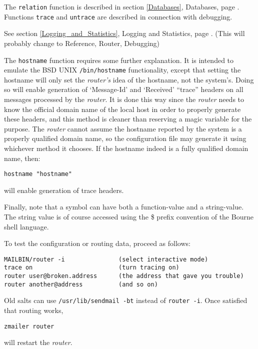 The {\tt relation} function is described in section
\ref{Databases},  Databases,
page \pageref{Databases}.
Functions {\tt trace} and {\tt untrace} are described
in connection with debugging. 

See section \ref{Logging_and_Statistics}, Logging and Statistics,
page \pageref{Logging_and_Statistics}.
(This will probably change to Reference, Router, Debugging)

The {\tt hostname} function requires some further explanation.
It is intended to emulate the BSD UNIX {\tt /bin/hostname}
functionality, except that setting the hostname will only set
the {\em router's\/} idea of the hostname, not the system's.
Doing so will enable generation of `Message-Id' and `Received'
``trace'' headers on all messages processed by the {\em router\/}.
It is done this way since the {\em router\/} needs to know the official
domain name of the local host in order to properly generate these headers,
and this method is cleaner than reserving a magic variable for the purpose.
The {\em router\/} cannot assume the hostname reported by the system is
a properly qualified domain name, so the configuration file may generate
it using whichever method it chooses.
If the hostname indeed is a fully qualified domain name, then:

\begin{verbatim}
hostname "hostname"
\end{verbatim}


will enable generation of trace headers.

Finally, note that a symbol can have both a function-value and a
string-value.  The string value is of course accessed using the \$ prefix
convention of the Bourne shell language.

To test the configuration or routing data, proceed as follows:

\begin{verbatim}
MAILBIN/router -i               (select interactive mode)
trace on                        (turn tracing on)
router user@broken.address      (the address that gave you trouble)
router another@address          (and so on)
\end{verbatim}


Old salts can use {\tt /usr/lib/sendmail -bt} instead of {\tt router -i}. Once satisfied that routing works,

\begin{verbatim}
zmailer router
\end{verbatim}


will restart the {\em router\/}.

